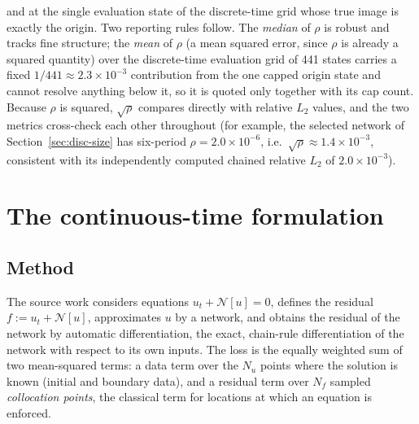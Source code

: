 \documentclass[11pt,a4paper]{article}
\begin{document}
\begin{enumerate}
  and at the single evaluation state of the discrete-time grid whose true
  image is exactly the origin. Two reporting rules follow. The
  \emph{median} of $\rho$ is robust and tracks fine structure; the
  \emph{mean} of $\rho$ (a mean squared error, since $\rho$ is already a
  squared quantity) over the discrete-time evaluation grid of 441 states
  carries a fixed $1/441 \approx 2.3\times10^{-3}$ contribution from the
  one capped origin state and cannot resolve anything below it, so it is
  quoted only together with its cap count. Because $\rho$ is squared,
  $\sqrt{\rho}$ compares directly with relative $L_2$ values, and the two
  metrics cross-check each other throughout (for example, the selected
  network of Section~\ref{sec:disc-size} has six-period
  $\rho = 2.0\times10^{-6}$, i.e.\
  $\sqrt{\rho} \approx 1.4\times10^{-3}$, consistent with its
  independently computed chained relative $L_2$ of $2.0\times10^{-3}$).
\end{enumerate}

\section{The continuous-time formulation}
\label{sec:cont-method}

\subsection{Method}

The source work considers equations $u_t + \mathcal{N}[u] = 0$, defines the
residual $f := u_t + \mathcal{N}[u]$, approximates $u$ by a network, and
obtains the residual of the network by automatic differentiation, the
exact, chain-rule differentiation of the network with respect to its own
inputs. The loss is the equally weighted sum of two mean-squared terms: a
data term over the $N_u$ points where the solution is known (initial and
boundary data), and a residual term over $N_f$ sampled \emph{collocation
points}, the classical term for locations at which an equation is enforced.
\end{document}
